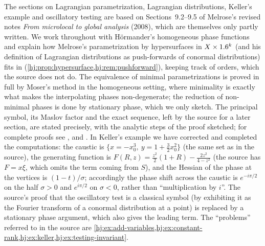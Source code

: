 The sections on Lagrangian parametrization, Lagrangian distributions, Keller's
example and oscillatory testing are based on Sections~9.2--9.5 of Melrose's
revised notes \emph{From microlocal to global analysis} (2008), which are
themselves only partly written.  We work throughout with H\"ormander's
homogeneous phase functions and explain how Melrose's parametrization by
hypersurfaces in $X\times1.6^k$ (and his definition of Lagrangian distributions
as push-forwards of conormal distributions) fits in
(\cref{hj:prop:hypersurface,hj:rem:pushforward}), keeping track of orders,
which the source does not do.  The equivalence of minimal parametrizations is
proved in full by Moser's method in the homogeneous setting, where minimality is
exactly what makes the interpolating phases non-degenerate; the reduction of
non-minimal phases is done by stationary phase, which we only sketch.  The
principal symbol, its Maslov factor and the exact sequence, left by the source
for a later section, are stated precisely, with the analytic steps of the
proof sketched; for complete proofs see \cite{Hormander-FIO},
\cite[Section~21.2]{Hormander-III} and \cite[Section~25.1]{Hormander-IV}.  In Keller's example we have
corrected and completed the computations: the caustic is
$\{x=-x_0^3,\ y=1+\frac32x_0^2\}$ (the same set as in the source), the
generating function is $F(R,z)=\frac{z^2}2(1+R)-\frac{2z^2}{4-z^2}$ (the
source has $F=x\xi$, which omits the term coming from $S$), and the Hessian of
the phase at the vertices is $(1-t)/\sigma$; accordingly the phase shift across
the caustic is $e^{-i\pi/2}$ on the half $\sigma>0$ and $e^{i\pi/2}$ on
$\sigma<0$, rather than ``multiplication by $i$''.  The source's proof that
the oscillatory test is a classical symbol (by exhibiting it as the Fourier
transform of a conormal distribution at a point) is replaced by a stationary
phase argument, which also gives the leading term.  The ``problems'' referred to
in the source are \cref{hj:ex:add-variables,hj:ex:constant-rank,hj:ex:keller,hj:ex:testing-invariant}.
